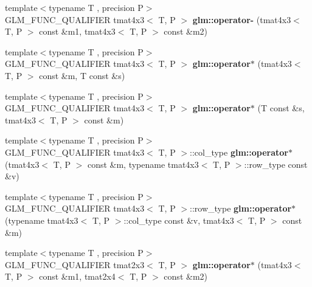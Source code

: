 \begin{DoxyCompactItemize}
\item 
\mbox{\label{type__mat4x3_8inl_a3366016f32730b6590831628678f7a75}} 
{\footnotesize template$<$typename T , precision P$>$ }\\G\+L\+M\+\_\+\+F\+U\+N\+C\+\_\+\+Q\+U\+A\+L\+I\+F\+I\+ER tmat4x3$<$ T, P $>$ {\bfseries glm\+::operator-\/} (tmat4x3$<$ T, P $>$ const \&m1, tmat4x3$<$ T, P $>$ const \&m2)
\item 
\mbox{\label{type__mat4x3_8inl_a4e17c31ba0dc7ad185b218ee3dda2195}} 
{\footnotesize template$<$typename T , precision P$>$ }\\G\+L\+M\+\_\+\+F\+U\+N\+C\+\_\+\+Q\+U\+A\+L\+I\+F\+I\+ER tmat4x3$<$ T, P $>$ {\bfseries glm\+::operator$\ast$} (tmat4x3$<$ T, P $>$ const \&m, T const \&s)
\item 
\mbox{\label{type__mat4x3_8inl_ae2f835ca42b71dfa2f26d44560209da6}} 
{\footnotesize template$<$typename T , precision P$>$ }\\G\+L\+M\+\_\+\+F\+U\+N\+C\+\_\+\+Q\+U\+A\+L\+I\+F\+I\+ER tmat4x3$<$ T, P $>$ {\bfseries glm\+::operator$\ast$} (T const \&s, tmat4x3$<$ T, P $>$ const \&m)
\item 
\mbox{\label{type__mat4x3_8inl_ab8bb5a16d976817057cca7d1ec66733c}} 
{\footnotesize template$<$typename T , precision P$>$ }\\G\+L\+M\+\_\+\+F\+U\+N\+C\+\_\+\+Q\+U\+A\+L\+I\+F\+I\+ER tmat4x3$<$ T, P $>$\+::col\+\_\+type {\bfseries glm\+::operator$\ast$} (tmat4x3$<$ T, P $>$ const \&m, typename tmat4x3$<$ T, P $>$\+::row\+\_\+type const \&v)
\item 
\mbox{\label{type__mat4x3_8inl_a214d9119a6b9cf32b547306ebf2b96bb}} 
{\footnotesize template$<$typename T , precision P$>$ }\\G\+L\+M\+\_\+\+F\+U\+N\+C\+\_\+\+Q\+U\+A\+L\+I\+F\+I\+ER tmat4x3$<$ T, P $>$\+::row\+\_\+type {\bfseries glm\+::operator$\ast$} (typename tmat4x3$<$ T, P $>$\+::col\+\_\+type const \&v, tmat4x3$<$ T, P $>$ const \&m)
\item 
\mbox{\label{type__mat4x3_8inl_af9121f804d71e079cbe1349c6715e869}} 
{\footnotesize template$<$typename T , precision P$>$ }\\G\+L\+M\+\_\+\+F\+U\+N\+C\+\_\+\+Q\+U\+A\+L\+I\+F\+I\+ER tmat2x3$<$ T, P $>$ {\bfseries glm\+::operator$\ast$} (tmat4x3$<$ T, P $>$ const \&m1, tmat2x4$<$ T, P $>$ const \&m2)

\end{DoxyCompactItemize}
